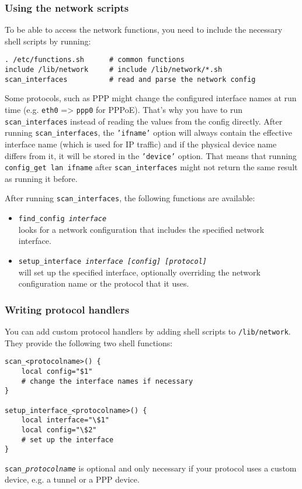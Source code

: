 \subsubsection{Using the network scripts}

To be able to access the network functions, you need to include
the necessary shell scripts by running:

\begin{Verbatim}
. /etc/functions.sh      # common functions
include /lib/network     # include /lib/network/*.sh
scan_interfaces          # read and parse the network config
\end{Verbatim}

Some protocols, such as PPP might change the configured interface names
at run time (e.g. \texttt{eth0} => \texttt{ppp0} for PPPoE). That's why you have to run
\texttt{scan\_interfaces} instead of reading the values from the config directly.
After running \texttt{scan\_interfaces}, the \texttt{'ifname'} option will always contain
the effective interface name (which is used for IP traffic) and if the
physical device name differs from it, it will be stored in the \texttt{'device'}
option.
That means that running \texttt{config\_get lan ifname}
after \texttt{scan\_interfaces} might not return the same result as running it before.

After running \texttt{scan\_interfaces}, the following functions are available:

\begin{itemize}
	\item{\texttt{find\_config \textit{interface}}} \\
		looks for a network configuration that includes
  		the specified network interface.

	\item{\texttt{setup\_interface \textit{interface [config] [protocol]}}} \\
	  will set up the specified interface, optionally overriding the network configuration
	  name or the protocol that it uses.
\end{itemize}

\subsubsection{Writing protocol handlers}

You can add custom protocol handlers by adding shell scripts to
\texttt{/lib/network}. They provide the following two shell functions:

\begin{Verbatim}
scan_<protocolname>() {
	local config="$1"
	# change the interface names if necessary
}

setup_interface_<protocolname>() {
	local interface="\$1"
	local config="\$2"
	# set up the interface
}
\end{Verbatim}

\texttt{scan\_\textit{protocolname}} is optional and only necessary if your protocol
uses a custom device, e.g. a tunnel or a PPP device.

